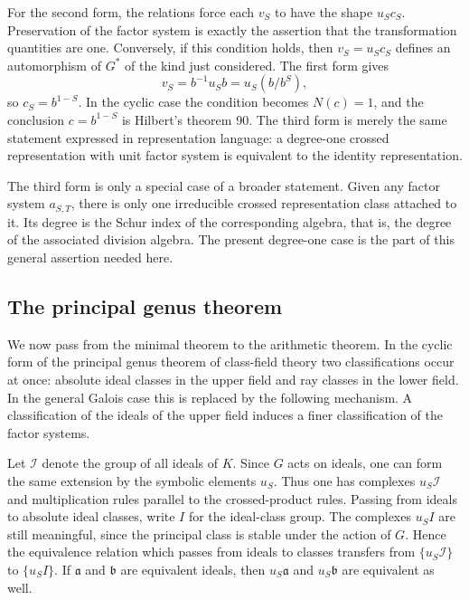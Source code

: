 \documentclass[11pt]{article}
\begin{document}
For the second form, the relations force each \(v_S\) to have the shape \(u_S c_S\). Preservation of the factor system is exactly the assertion that the transformation quantities are one. Conversely, if this condition holds, then \(v_S=u_Sc_S\) defines an automorphism of \(G^*\) of the kind just considered. The first form gives
\[
  v_S=b^{-1}u_Sb=u_S(b/b^S),
\]
so \(c_S=b^{1-S}\). In the cyclic case the condition becomes \(N(c)=1\), and the conclusion \(c=b^{1-S}\) is Hilbert's theorem 90. The third form is merely the same statement expressed in representation language: a degree-one crossed representation with unit factor system is equivalent to the identity representation.

The third form is only a special case of a broader statement. Given any factor system \(a_{S,T}\), there is only one irreducible crossed representation class attached to it. Its degree is the Schur index of the corresponding algebra, that is, the degree of the associated division algebra. The present degree-one case is the part of this general assertion needed here.

\subsection{The principal genus theorem}

We now pass from the minimal theorem to the arithmetic theorem. In the cyclic form of the principal genus theorem of class-field theory two classifications occur at once: absolute ideal classes in the upper field and ray classes in the lower field. In the general Galois case this is replaced by the following mechanism. A classification of the ideals of the upper field induces a finer classification of the factor systems.

Let \(\mathcal I\) denote the group of all ideals of \(K\). Since \(G\) acts on ideals, one can form the same extension by the symbolic elements \(u_S\). Thus one has complexes \(u_S\mathcal I\) and multiplication rules parallel to the crossed-product rules. Passing from ideals to absolute ideal classes, write \(I\) for the ideal-class group. The complexes \(u_S I\) are still meaningful, since the principal class is stable under the action of \(G\). Hence the equivalence relation which passes from ideals to classes transfers from \(\{u_S\mathcal I\}\) to \(\{u_S I\}\). If \(\mathfrak a\) and \(\mathfrak b\) are equivalent ideals, then \(u_S\mathfrak a\) and \(u_S\mathfrak b\) are equivalent as well.
\end{document}
